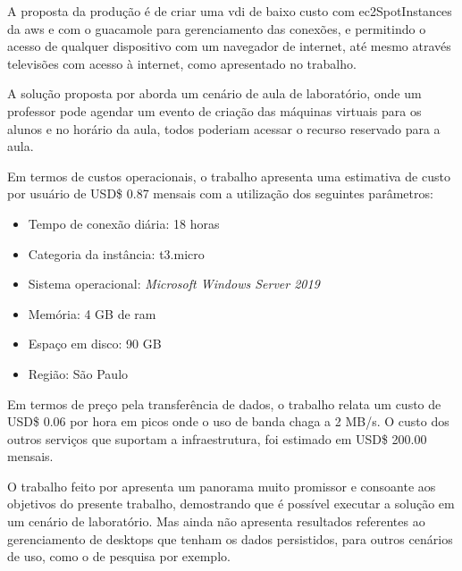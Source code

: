 A proposta da produção é de criar uma \gls{vdi} de baixo custo com \glspl{ec2SpotInstance} da
\gls{aws} e com o \gls{guacamole} para gerenciamento das conexões, e permitindo o acesso de
qualquer dispositivo com um navegador de internet, até mesmo através televisões com acesso à internet,
como apresentado no trabalho.

A solução proposta por \citet{edufirestick} aborda um cenário de aula de laboratório, onde um
professor pode agendar um evento de criação das máquinas virtuais para os alunos e no horário da
aula, todos poderiam acessar o recurso reservado para a aula.

Em termos de custos operacionais, o trabalho apresenta uma estimativa de custo por usuário de
USD\$ 0.87 mensais com a utilização dos seguintes parâmetros:

\begin{itemize}
    \item Tempo de conexão diária: 18 horas
    \item Categoria da instância: t3.micro
    \item Sistema operacional: \textit{Microsoft Windows Server 2019}
    \item Memória: 4 GB de \gls{ram}
    \item Espaço em disco: 90 GB
    \item Região: São Paulo
\end{itemize}

Em termos de preço pela transferência de dados, o trabalho relata um custo de USD\$ 0.06 por hora em
picos onde o uso de banda chaga a 2 MB/s. O custo dos outros serviços que suportam a infraestrutura,
foi estimado em USD\$ 200.00 mensais.

O trabalho feito por \citet{edufirestick} apresenta um panorama muito promissor e consoante aos
objetivos do presente trabalho, demostrando que é possível executar a solução em um cenário de
laboratório. Mas ainda não apresenta resultados referentes ao gerenciamento de \glspl{desktop} que
tenham os dados persistidos, para outros cenários de uso, como o de pesquisa por exemplo.